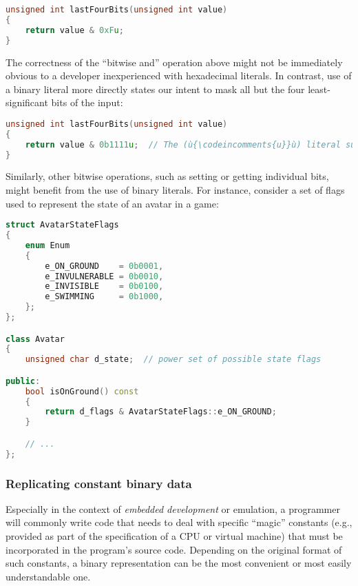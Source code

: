 \begin{lstlisting}[language=C++]
unsigned int lastFourBits(unsigned int value)
{
    return value & 0xFu;
}
\end{lstlisting}
    

\noindent The correctness of the ``bitwise and'' operation above might not be
immediately obvious to a developer inexperienced with
hexadecimal literals. In contrast, use of a binary literal more directly
states our intent to mask all but the four least-significant bits of the
input:

\begin{lstlisting}[language=C++]
unsigned int lastFourBits(unsigned int value)
{
    return value & 0b1111u;  // The (ù{\codeincomments{u}}ù) literal suffix here is entirely optional.
}
\end{lstlisting}
    

Similarly, other bitwise operations, such as setting or getting
individual bits, might benefit from the use of binary literals. For
instance, consider a set of flags used to represent the state of an
avatar in a game:

\begin{lstlisting}[language=C++]
struct AvatarStateFlags
{
    enum Enum
    {
        e_ON_GROUND    = 0b0001,
        e_INVULNERABLE = 0b0010,
        e_INVISIBLE    = 0b0100,
        e_SWIMMING     = 0b1000,
    };
};

class Avatar
{
    unsigned char d_state;  // power set of possible state flags

public:
    bool isOnGround() const
    {
        return d_flags & AvatarStateFlags::e_ON_GROUND;
    }

    // ...
};
\end{lstlisting}
    

\subsubsection[Replicating constant binary data]{Replicating constant binary data}\label{replicating-constant-binary-data}

Especially in the context of \emph{embedded development} or emulation,
a programmer will commonly write code that needs to deal
with specific ``magic'' constants (e.g., provided as part of the
specification of a CPU or virtual machine) that must be incorporated in
the program's source code. Depending on the original format of such
constants, a binary representation can be the most convenient or most
easily understandable one.

